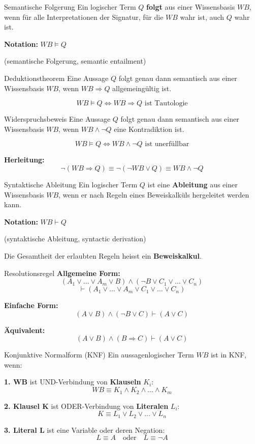 \documentclass[a4paper, fontsize=7pt]{scrartcl}
\begin{document}
\begin{mainbox}{Semantische Folgerung}
Ein logischer Term $Q$ \textbf{folgt} aus einer Wissensbasis $WB$, wenn für alle Interpretationen der Signatur, für die $WB$ wahr ist, auch $Q$ wahr ist.

\textbf{Notation:} $WB \models Q$

(semantische Folgerung, semantic entailment)
\end{mainbox}

\begin{mainbox}{Deduktionstheorem}
Eine Aussage $Q$ folgt genau dann semantisch aus einer Wissensbasis $WB$, wenn $WB \Rightarrow Q$ allgemeingültig ist.

$$WB \models Q \iff WB \Rightarrow Q \text{ ist Tautologie}$$
\end{mainbox}

\begin{mainbox}{Widerspruchsbeweis}
Eine Aussage $Q$ folgt genau dann semantisch aus einer Wissensbasis $WB$, wenn $WB \land \neg Q$ eine Kontradiktion ist.

$$WB \models Q \iff WB \land \neg Q \text{ ist unerfüllbar}$$

\textbf{Herleitung:}
$$\neg(WB \Rightarrow Q) \equiv \neg(\neg WB \lor Q) \equiv WB \land \neg Q$$
\end{mainbox}

\begin{mainbox}{Syntaktische Ableitung}
Ein logischer Term $Q$ ist eine \textbf{Ableitung} aus einer Wissensbasis $WB$, wenn er nach Regeln eines Beweiskalküls hergeleitet werden kann.

\textbf{Notation:} $WB \vdash Q$

(syntaktische Ableitung, syntactic derivation)

Die Gesamtheit der erlaubten Regeln heisst ein \textbf{Beweiskalkul}.
\end{mainbox}

\begin{mainbox}{Resolutionsregel}
\textbf{Allgemeine Form:}
$$(A_1 \lor \ldots \lor A_m \lor B) \land (\neg B \lor C_1 \lor \ldots \lor C_n)$$
$$\vdash (A_1 \lor \ldots \lor A_m \lor C_1 \lor \ldots \lor C_n)$$

\textbf{Einfache Form:}
$$(A \lor B) \land (\neg B \lor C) \vdash (A \lor C)$$

\textbf{Äquivalent:}
$$(A \lor B) \land (B \Rightarrow C) \vdash (A \lor C)$$
\end{mainbox}

\begin{mainbox}{Konjunktive Normalform (KNF)}
Ein aussagenlogischer Term $WB$ ist in KNF, wenn:

\textbf{1. WB} ist UND-Verbindung von \textbf{Klauseln} $K_i$:
$$WB \equiv K_1 \land K_2 \land \ldots \land K_m$$

\textbf{2. Klausel K} ist ODER-Verbindung von \textbf{Literalen} $L_i$:
$$K \equiv L_1 \lor L_2 \lor \ldots \lor L_n$$

\textbf{3. Literal L} ist eine Variable oder deren Negation:
$$L \equiv A \quad \text{oder} \quad L \equiv \neg A$$
\end{mainbox}
\end{document}
